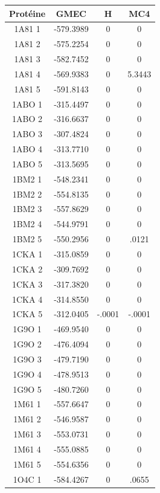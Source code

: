 \documentclass[a4paper,12pt]{article}
\begin{document}
    \begin{table}[!htbp]
      \centering

      \begin{tabular}{|c|c|c|c|}



   \hline
   \hline
   Protéine & GMEC & H & MC4 \\
   \hline
   1A81 1 & -579.3989 & 0 & 0 \\
   1A81 2 & -575.2254 & 0 & 0 \\
   1A81 3 & -582.7452 & 0 & 0 \\
   1A81 4 & -569.9383 & 0 & 5.3443 \\
   1A81 5 & -591.8143 & 0 & 0 \\
   1ABO 1 & -315.4497 & 0 & 0 \\
   1ABO 2 & -316.6637 & 0 & 0 \\
   1ABO 3 & -307.4824 & 0 & 0 \\
   1ABO 4 & -313.7710 & 0 & 0 \\
   1ABO 5 & -313.5695 & 0 & 0 \\
   1BM2 1 & -548.2341 & 0 & 0 \\
   1BM2 2 & -554.8135 & 0 & 0 \\
   1BM2 3 & -557.8629 & 0 & 0 \\
   1BM2 4 & -544.9791 & 0 & 0 \\
   1BM2 5 & -550.2956 & 0 & .0121 \\
   1CKA 1 & -315.0859 & 0 & 0 \\
   1CKA 2 & -309.7692 & 0 & 0 \\
   1CKA 3 & -317.3820 & 0 & 0 \\
   1CKA 4 & -314.8550 & 0 & 0 \\
   1CKA 5 & -312.0405 & -.0001 & -.0001 \\
   1G9O 1 & -469.9540 & 0 & 0 \\
   1G9O 2 & -476.4094 & 0 & 0 \\
   1G9O 3 & -479.7190 & 0 & 0 \\
   1G9O 4 & -478.9513 & 0 & 0 \\
   1G9O 5 & -480.7260 & 0 & 0 \\
   1M61 1 & -557.6647 & 0 & 0 \\
   1M61 2 & -546.9587 & 0 & 0 \\
   1M61 3 & -553.0731 & 0 & 0 \\
   1M61 4 & -555.0885 & 0 & 0 \\
   1M61 5 & -554.6356 & 0 & 0 \\
   1O4C 1 & -584.4267 & 0 & .0655 \\

\end{tabular}
\end{table}
\end{document}
